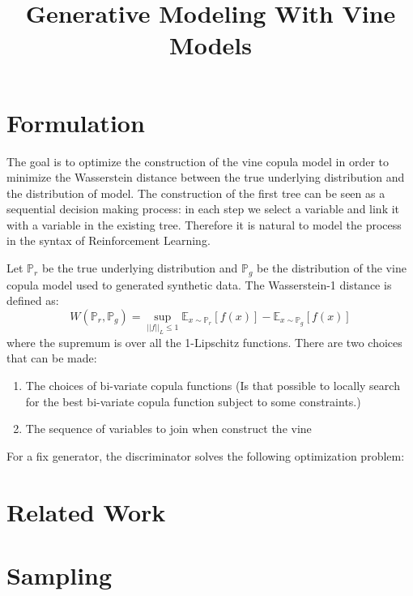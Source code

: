 \documentclass{article}
\begin{document}
\title{Generative Modeling With Vine Models}

\maketitle
\section{Formulation}
The goal is to optimize the construction of the vine copula model in order to minimize the Wasserstein distance between the true underlying distribution and the distribution of model. 
The construction of the first tree can be seen as a sequential decision making process: in each step we select a variable and link it with a variable in the existing tree. Therefore it is natural to model the process in the syntax of Reinforcement Learning. 

Let $\mathbb{P}_r$ be the true underlying distribution and $\mathbb{P}_g$ be the distribution of the vine copula model used to generated synthetic data.
The Wasserstein-1 distance is defined as:
\[
W(\mathbb{P}_r,\mathbb{P}_g)=\sup_{||f||_L\leq1}\mathbb{E}_{x\sim\mathbb{P}_r}[f(x)]-\mathbb{E}_{x\sim\mathbb{P}_g}[f(x)]
\]
where the supremum is over all the 1-Lipschitz functions.
There are two choices that can be made:
\begin{enumerate}
    \item The choices of bi-variate copula functions (Is that possible to locally search for the best bi-variate copula function subject to some constraints.)
    \item The sequence of variables to join when construct the vine
\end{enumerate}



For a fix generator, the discriminator solves the following optimization problem:
\[

\]
\section{Related Work}













\section{Sampling}
\end{document}

